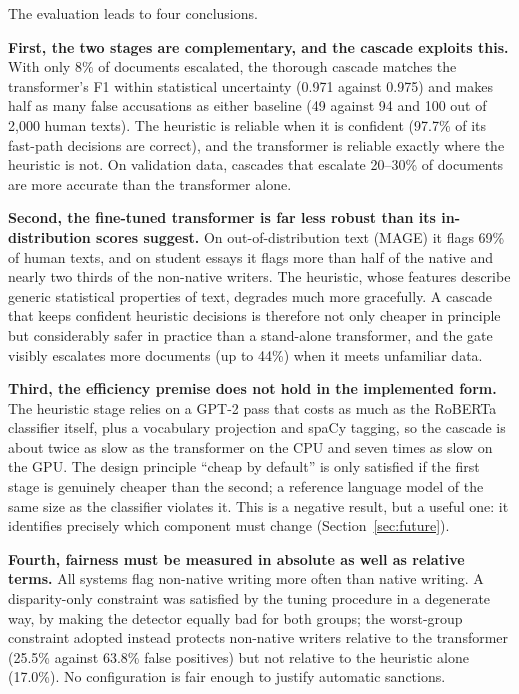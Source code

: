 The evaluation leads to four conclusions.

\textbf{First, the two stages are complementary, and the cascade exploits
this.} With only 8\% of documents escalated, the thorough cascade matches the
transformer's F1 within statistical uncertainty (0.971 against 0.975) and makes
half as many false accusations as either baseline (49 against 94 and 100 out of
2,000 human texts). The heuristic is reliable when it is confident (97.7\% of
its fast-path decisions are correct), and the transformer is reliable exactly
where the heuristic is not. On validation data, cascades that escalate 20--30\%
of documents are more accurate than the transformer alone.

\textbf{Second, the fine-tuned transformer is far less robust than its
in-distribution scores suggest.} On out-of-distribution text (MAGE) it flags
69\% of human texts, and on student essays it flags more than half of the native
and nearly two thirds of the non-native writers. The heuristic, whose features
describe generic statistical properties of text, degrades much more gracefully.
A cascade that keeps confident heuristic decisions is therefore not only
cheaper in principle but considerably safer in practice than a stand-alone
transformer, and the gate visibly escalates more documents (up to 44\%) when it
meets unfamiliar data.

\textbf{Third, the efficiency premise does not hold in the implemented form.}
The heuristic stage relies on a GPT-2 pass that costs as much as the RoBERTa
classifier itself, plus a vocabulary projection and spaCy tagging, so the
cascade is about twice as slow as the transformer on the CPU and seven times as
slow on the GPU. The design principle ``cheap by default'' is only satisfied if
the first stage is genuinely cheaper than the second; a reference language
model of the same size as the classifier violates it. This is a negative result,
but a useful one: it identifies precisely which component must change
(Section~\ref{sec:future}).

\textbf{Fourth, fairness must be measured in absolute as well as relative
terms.} All systems flag non-native writing more often than native writing. A
disparity-only constraint was satisfied by the tuning procedure in a degenerate
way, by making the detector equally bad for both groups; the worst-group
constraint adopted instead protects non-native writers relative to the
transformer (25.5\% against 63.8\% false positives) but not relative to the
heuristic alone (17.0\%). No configuration is fair enough to justify automatic
sanctions.

